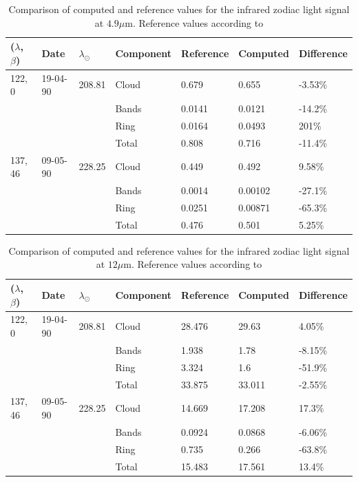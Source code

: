 \begin{table}[htbp]
\centering
\caption{Comparison of computed and reference values for the infrared zodiac light signal at $4.9\mu$m. Reference values according to \cite{IRDust}}
\label{tab:49irbackground}
\begin{tabular}{lll|l|lll}
($\lambda$, $\beta$)    & Date     & $\lambda_{\odot}$  & Component & Reference & Computed & Difference \\ \hline
122, 0  & 19-04-90 & 208.81 & Cloud     & 0.679     & 0.655    & -3.53\%    \\
        &          &        & Bands     & 0.0141    & 0.0121   & -14.2\%    \\
        &          &        & Ring      & 0.0164    & 0.0493   & 201\%      \\ \hline
        &          &        & Total     & 0.808     & 0.716    & -11.4\%    \\ \hline
137, 46 & 09-05-90 & 228.25 & Cloud     & 0.449     & 0.492    & 9.58\%     \\
        &          &        & Bands     & 0.0014    & 0.00102  & -27.1\%    \\
        &          &        & Ring      & 0.0251    & 0.00871  & -65.3\%    \\ \hline
        &          &        & Total     & 0.476     & 0.501    & 5.25\%    
\end{tabular}
\end{table}

\begin{table}[htbp]
\centering
\caption{Comparison of computed and reference values for the infrared zodiac light signal at $12\mu$m. Reference values according to \cite{IRDust}}
\label{tab:12irbackground}
\begin{tabular}{lll|l|lll}
($\lambda$, $\beta$)    & Date     & $\lambda_{\odot}$  & Component & Reference & Computed & Difference \\ \hline
122, 0  & 19-04-90 & 208.81 & Cloud     & 28.476    & 29.63    & 4.05\%     \\
        &          &        & Bands     & 1.938     & 1.78     & -8.15\%    \\
        &          &        & Ring      & 3.324     & 1.6      & -51.9\%    \\ \hline
        &          &        & Total     & 33.875    & 33.011   & -2.55\%    \\ \hline
137, 46 & 09-05-90 & 228.25 & Cloud     & 14.669    & 17.208   & 17.3\%     \\
        &          &        & Bands     & 0.0924    & 0.0868   & -6.06\%    \\
        &          &        & Ring      & 0.735     & 0.266    & -63.8\%    \\ \hline
        &          &        & Total     & 15.483    & 17.561   & 13.4\%    
\end{tabular}
\end{table}

